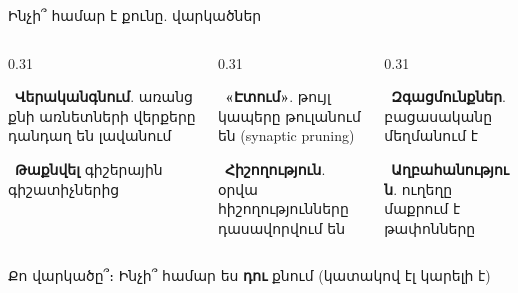 \begin{frame}{Ինչի՞ համար է քունը. վարկածներ}
  \begin{columns}[T]
    \begin{column}{0.31\textwidth}
      \begin{card}[hyp, colback=mint!30!cardwhite]\ \textbf{Վերականգնում}. առանց քնի առնետների վերքերը դանդաղ են լավանում\end{card}
      \begin{card}[hyp, colback=mint!30!cardwhite]\ \textbf{Թաքնվել} գիշերային գիշատիչներից\end{card}
    \end{column}
    \begin{column}{0.31\textwidth}
      \begin{card}[hyp, colback=lavender!35!cardwhite]\ \textbf{«Էտում»}. թույլ կապերը թուլանում են (synaptic pruning)\end{card}
      \begin{card}[hyp, colback=lavender!35!cardwhite]\ \textbf{Հիշողություն}. օրվա հիշողությունները դասավորվում են\end{card}
    \end{column}
    \begin{column}{0.31\textwidth}
      \begin{card}[hyp, colback=peach!35!cardwhite]\ \textbf{Զգացմունքներ}. բացասականը մեղմանում է\end{card}
      \begin{card}[hyp, colback=peach!35!cardwhite]\ \textbf{Աղբահանություն}. ուղեղը մաքրում է թափոնները\end{card}
    \end{column}
  \end{columns}
  \begin{chatbox}
    Քո վարկածը՞։ Ինչի՞ համար ես \textbf{դու} քնում (կատակով էլ կարելի է)
  \end{chatbox}
\end{frame}

